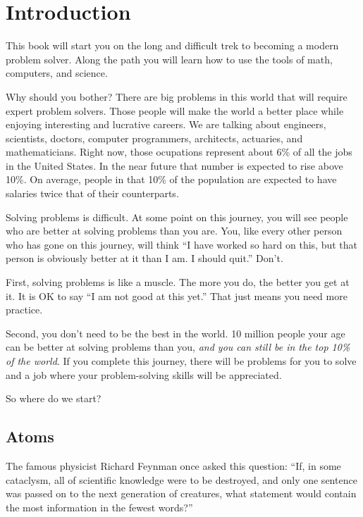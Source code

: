 \chapter{Introduction}

This book will start you on the long and difficult trek to becoming a modern
problem solver. Along the path you will learn how to use the tools of
math, computers, and science. 

Why should you bother? There are big problems in this world that will
require expert problem solvers. Those people will make the world a
better place while enjoying interesting and lucrative careers. We are
talking about engineers, scientists, doctors, computer programmers,
architects, actuaries, and mathematicians. Right now, those ocupations represent
about 6\% of all the jobs in the United States. In the near future
that number is expected to rise above 10\%.  On average, people in
that 10\% of the population are expected to have salaries twice that
of their counterparts.

Solving problems is difficult. At some point on this journey, you will
see people who are better at solving problems than you are. You, like
every other person who has gone on this journey, will think ``I have
worked so hard on this, but that person is obviously better at it than
I am. I should quit.'' Don't.

First, solving problems is like a muscle. The more you do, the better
you get at it.  It is OK to say ``I am not good at this yet.'' That
just means you need more practice.

Second, you don't need to be the best in the world. 10 million people
your age can be better at solving problems than you, \textit{and you
  can still be in the top 10\% of the world}. If you complete this
journey, there will be problems for you to solve and a job where your
problem-solving skills will be appreciated.

So where do we start?

\section{Atoms}

The famous physicist Richard Feynman once asked this question: ``If,
in some cataclysm, all of scientific knowledge were to be destroyed,
and only one sentence was passed on to the next generation of
creatures, what statement would contain the most information in the
fewest words?''

